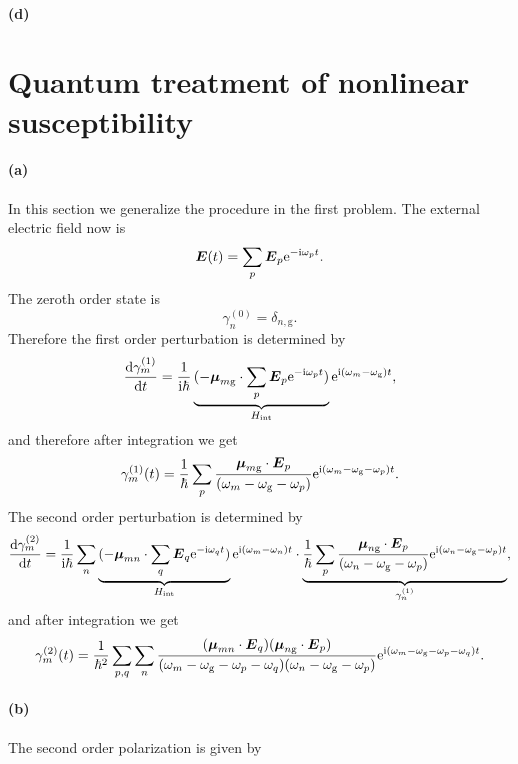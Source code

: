 \documentclass[hyperref, a4paper]{article}
\newcommand*{\ii}{\mathrm{i}}
\newcommand*{\ee}{\mathrm{e}}
\newcommand*{\omegag}{\omega_{\text{g}}}
\begin{document}
\paragraph*{(d)} 

\section{Quantum treatment of nonlinear susceptibility}

\paragraph*{(a)} In this section we generalize the procedure in the first problem.
The external electric field now is  
\begin{equation}
    \vb*{E}(t) = \sum_p \vb*{E}_p \ee^{- \ii \omega_p t}.
\end{equation}
The zeroth order state is  
\begin{equation}
    \gamma^{(0)}_n = \delta_{n, \text{g}} .
\end{equation}
Therefore the first order perturbation is determined by 
\begin{equation}
    \dv{\gamma_m^{(1)}}{t} = \frac{1}{\ii \hbar} 
    \underbrace{
        (- \vb*{\mu}_{m \text{g}} \cdot \sum_p \vb*{E}_p \ee^{- \ii \omega_p t}) 
    }_{H_{\text{int}}}
    \ee^{\ii (\omega_m - \omegag) t} ,
\end{equation}
and therefore after integration we get 
\begin{equation}
    \gamma_m^{(1)}(t) = \frac{1}{\hbar} \sum_p \frac{\vb*{\mu}_{m \text{g}} \cdot \vb*{E}_p}{(\omega_m - \omegag - \omega_p)} \ee^{\ii (\omega_m - \omegag - \omega_p) t}.
\end{equation}
The second order perturbation is determined by 
\begin{equation}
    \dv{\gamma_m^{(2)}}{t} = \frac{1}{\ii \hbar} \sum_n
    \underbrace{
        (- \vb*{\mu}_{m n} \cdot \sum_q \vb*{E}_q \ee^{- \ii \omega_q t}) 
    }_{H_{\text{int}}}
    \ee^{\ii (\omega_m - \omega_n) t} 
    \cdot \underbrace{\frac{1}{\hbar} \sum_p \frac{\vb*{\mu}_{n \text{g}} \cdot \vb*{E}_p}{(\omega_n - \omegag - \omega_p)} \ee^{\ii (\omega_n - \omegag - \omega_p) t}}_{\gamma_n^{(1)}} ,
\end{equation}
and after integration we get 
\begin{equation}
    \gamma_m^{(2)}(t) = \frac{1}{\hbar^2} \sum_{p, q} \sum_n
    \frac{
        (\vb*{\mu}_{mn} \cdot \vb*{E}_q) (\vb*{\mu}_{n \text{g}} \cdot \vb*{E}_p)
    }{
        (\omega_m - \omegag - \omega_p - \omega_q)
        (\omega_n - \omegag - \omega_p)
    } \ee^{\ii (\omega_m - \omegag - \omega_p - \omega_q) t}.
\end{equation}

\paragraph*{(b)} The second order polarization is given by 
\end{document}

